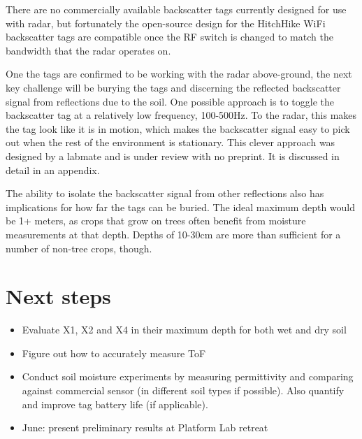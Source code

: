 \documentclass[12pt]{article}
\begin{document}

There are no commercially available backscatter tags currently
designed for use with radar, but fortunately the open-source design
for the HitchHike WiFi backscatter tags are compatible once the RF
switch is changed to match the bandwidth that the radar operates on.

One the tags are confirmed to be working with the radar above-ground,
the next key challenge will be burying the tags and discerning the
reflected backscatter signal from reflections due to the soil. One
possible approach is to toggle the backscatter tag at a relatively low
frequency, 100-500Hz. To the radar, this makes the tag look like it is
in motion, which makes the backscatter signal easy to pick out when
the rest of the environment is stationary. This clever approach was
designed by a labmate and is under review with no preprint. It is
discussed in detail in an appendix.

The ability to isolate the backscatter signal from other reflections
also has implications for how far the tags can be buried. The ideal
maximum depth would be 1+ meters, as crops that grow on trees often
benefit from moisture measurements at that depth. Depths of 10-30cm
are more than sufficient for a number of non-tree crops, though.




\section*{Next steps}
\begin{itemize}
\item Evaluate X1, X2 and X4 in their maximum depth for both wet and dry soil
\item Figure out how to accurately measure ToF  
\item Conduct soil moisture experiments by measuring
  permittivity and comparing against commercial sensor (in different
  soil types if possible). Also quantify and improve tag battery life
  (if applicable).
\item June: present preliminary results at Platform Lab retreat
\end{itemize}
\end{document}
